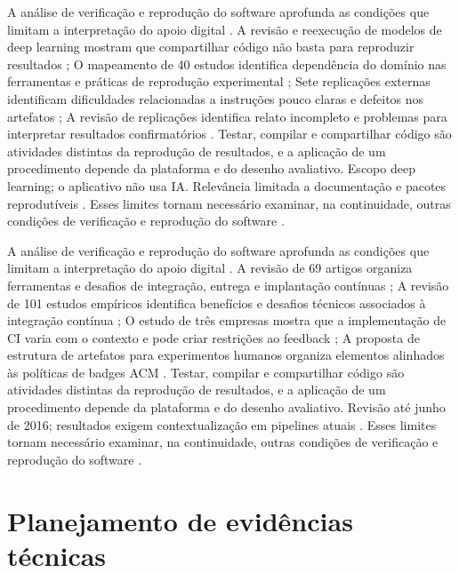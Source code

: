 A análise de verificação e reprodução do software aprofunda as condições que limitam a interpretação do apoio digital \citep{eng10} \citep{eng11} \citep{eng12} \citep{eng13}. A revisão e reexecução de modelos de deep learning mostram que compartilhar código não basta para reproduzir resultados \citep{eng10}; O mapeamento de 40 estudos identifica dependência do domínio nas ferramentas e práticas de reprodução experimental \citep{eng11}; Sete replicações externas identificam dificuldades relacionadas a instruções pouco claras e defeitos nos artefatos \citep{eng12}; A revisão de replicações identifica relato incompleto e problemas para interpretar resultados confirmatórios \citep{eng13}. Testar, compilar e compartilhar código são atividades distintas da reprodução de resultados, e a aplicação de um procedimento depende da plataforma e do desenho avaliativo. Escopo deep learning; o aplicativo não usa IA. Relevância limitada a documentação e pacotes reprodutíveis \citep{eng10} \citep{eng11} \citep{eng12} \citep{eng13}. Esses limites tornam necessário examinar, na continuidade, outras condições de verificação e reprodução do software \citep{eng10} \citep{eng11} \citep{eng12} \citep{eng13}.

A análise de verificação e reprodução do software aprofunda as condições que limitam a interpretação do apoio digital \citep{eng14} \citep{eng15} \citep{eng16} \citep{eng18}. A revisão de 69 artigos organiza ferramentas e desafios de integração, entrega e implantação contínuas \citep{eng14}; A revisão de 101 estudos empíricos identifica benefícios e desafios técnicos associados à integração contínua \citep{eng15}; O estudo de três empresas mostra que a implementação de CI varia com o contexto e pode criar restrições ao feedback \citep{eng16}; A proposta de estrutura de artefatos para experimentos humanos organiza elementos alinhados às políticas de badges ACM \citep{eng18}. Testar, compilar e compartilhar código são atividades distintas da reprodução de resultados, e a aplicação de um procedimento depende da plataforma e do desenho avaliativo. Revisão até junho de 2016; resultados exigem contextualização em pipelines atuais \citep{eng14} \citep{eng15} \citep{eng16} \citep{eng18}. Esses limites tornam necessário examinar, na continuidade, outras condições de verificação e reprodução do software \citep{eng14} \citep{eng15} \citep{eng16} \citep{eng18}.

\clearpage\section{Planejamento de evidências técnicas}

